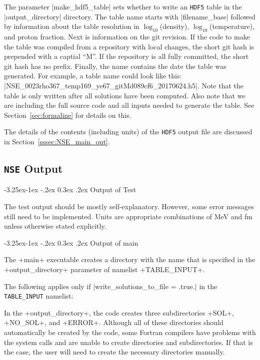 \documentclass[letterpaper,11pt]{refart}
\makeatletter
\renewcommand\subsubsection{\@startsection{subsubsection}{3}{\z@}%
                           {-3.25ex\@plus -1ex \@minus -.2ex}%
                           {0.3ex \@plus .2ex}%
                           {\normalfont\normalsize\bf\fontsize{11}{13}\selectfont}}
\makeatother
\begin{document}
The parameter \verbprm|make_hdf5_table| sets whether to write an 
\verb|HDF5| table in the \verbfile|output_directory| directory. 
The table name starts with \verbprm|filename_base| followed by 
information about the table resolution in $\log_{10}$(density), 
$\log_{10}$(temperature), and proton fraction. Next is information on 
the git revision. If the code to make the table was compiled from a 
repository with local changes, the short git hash is prepended with a 
captial ``M''. If the repository is all fully committed, the short git 
hash has no prefix. Finally, the name contains the date the table was
generated. For example, a table name could look like 
this: \verbfile|NSE_0023rho367_temp169_ye67_gitMd089cf6_20170624.h5|.  
Note that the table is only written after all solutions have been
computed. Also note that we are including the full source code and all
inputs needed to generate the table. See Section~\ref{sec:formaline}
for details on this.


The details of the contents (including units) of the \verb|HDF5| output file 
are discussed in Section~\ref{sssec:NSE_main_out}.


\subsection{\texttt{NSE} Output}\label{ssec:NSE_out}


\subsubsection{Output of Test}\label{sssec:NSE_test_out}


The test output should be mostly self-explanatory.  However, some
error messages still need to be implemented.  Units are appropriate
combinations of MeV and fm unless otherwise stated explicitly.


\subsubsection{Output of main}\label{sssec:NSE_main_out}


The \verbexec+main+ executable creates a directory with the name that
is specified in the \verbprm+output_directory+ parameter of namelist
\verbnml+TABLE_INPUT+.

The following applies only if \verbprm|write_solutions_to_file = .true.| in the
\texttt{\color{cyan}TABLE\_INPUT} namelist:

In the \verbprm+output_directory+, the code creates three
subdirectories \verbfile+SOL+, \verbfile+NO_SOL+, and
\verbfile+ERROR+.  Although all of these directories should
automatically be created by the code, some Fortran compilers have
problems with the system calls and are unable to create directories
and subdirectories.  If that is the case, the user will need to create
the necessary directories manually.
\end{document}
